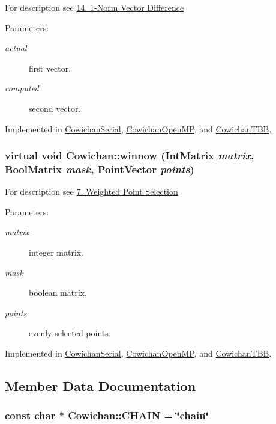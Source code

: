 For description see \hyperlink{index_vecdiff_sec}{14. 1-Norm Vector Difference} \begin{Desc}
\item[Parameters:]
\begin{description}
\item[{\em actual}]first vector. \item[{\em computed}]second vector. \end{description}
\end{Desc}


Implemented in \hyperlink{class_cowichan_serial_34b75a2084051b3677071bb3c334d1f4}{CowichanSerial}, \hyperlink{class_cowichan_open_m_p_92aa23ed47da0a5a3b43416ab08199b3}{CowichanOpenMP}, and \hyperlink{class_cowichan_t_b_b_28c976743df231fd183e4db9306050b1}{CowichanTBB}.\hypertarget{class_cowichan_13d60e06ced3b5da79d62c133ce82337}{
\subsubsection[{winnow}]{\setlength{\rightskip}{0pt plus 5cm}virtual void Cowichan::winnow ({\bf IntMatrix} {\em matrix}, \/  {\bf BoolMatrix} {\em mask}, \/  {\bf PointVector} {\em points})}}
\label{class_cowichan_13d60e06ced3b5da79d62c133ce82337}


For description see \hyperlink{index_winnow_sec}{7. Weighted Point Selection} \begin{Desc}
\item[Parameters:]
\begin{description}
\item[{\em matrix}]integer matrix. \item[{\em mask}]boolean matrix. \item[{\em points}]evenly selected points. \end{description}
\end{Desc}


Implemented in \hyperlink{class_cowichan_serial_33daca65431f792c2f4f0e7f8d29fa01}{CowichanSerial}, \hyperlink{class_cowichan_open_m_p_4a518f2b5590d4acd670f333471a380a}{CowichanOpenMP}, and \hyperlink{class_cowichan_t_b_b_77178470ef780e0505137dc1d22a85a2}{CowichanTBB}.

\subsection{Member Data Documentation}
\hypertarget{class_cowichan_17937f5dfe24c46c00a76d48ca70ccaa}{
\subsubsection[{CHAIN}]{\setlength{\rightskip}{0pt plus 5cm}const char $\ast$ {\bf Cowichan::CHAIN} = \char`\"{}chain\char`\"{}}}
\label{class_cowichan_17937f5dfe24c46c00a76d48ca70ccaa}


